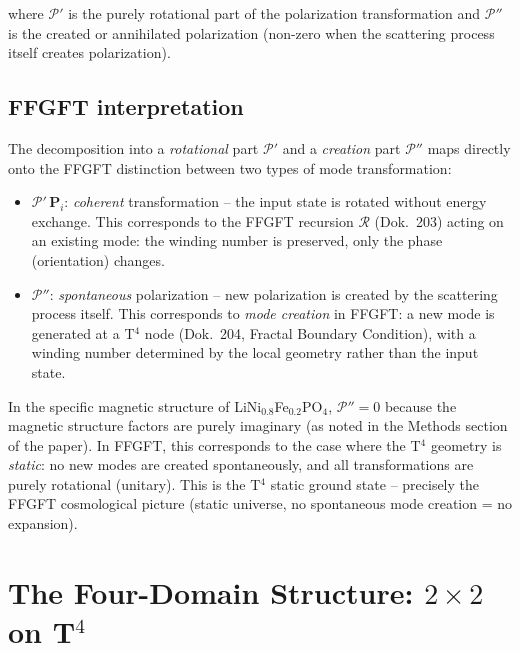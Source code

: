 \noindent where $\mathcal{P}'$ is the purely rotational part of the
polarization transformation and $\mathcal{P}''$ is the created or
annihilated polarization (non-zero when the scattering process itself
creates polarization).

\subsection*{FFGFT interpretation}

The decomposition into a \emph{rotational} part $\mathcal{P}'$ and a
\emph{creation} part $\mathcal{P}''$ maps directly onto the FFGFT
distinction between two types of mode transformation:

\begin{itemize}
  \item $\mathcal{P}'\,\mathbf{P}_i$: \emph{coherent} transformation --
        the input state is rotated without energy exchange. This corresponds
        to the FFGFT recursion $\mathcal{R}$ (Dok.~203) acting on an existing
        mode: the winding number is preserved, only the phase (orientation)
        changes.
  \item $\mathcal{P}''$: \emph{spontaneous} polarization -- new polarization
        is created by the scattering process itself. This corresponds to
        \emph{mode creation} in FFGFT: a new mode is generated at a T$^4$
        node (Dok.~204, Fractal Boundary Condition), with a winding number
        determined by the local geometry rather than the input state.
\end{itemize}

\noindent In the specific magnetic structure of LiNi$_{0.8}$Fe$_{0.2}$PO$_4$,
$\mathcal{P}''=0$ because the magnetic structure factors are purely imaginary
(as noted in the Methods section of the paper). In FFGFT, this corresponds to
the case where the T$^4$ geometry is \emph{static}: no new modes are created
spontaneously, and all transformations are purely rotational (unitary). This
is the T$^4$ static ground state -- precisely the FFGFT cosmological picture
(static universe, no spontaneous mode creation = no expansion).

\section{The Four-Domain Structure: $2\times2$ on T$^4$}

